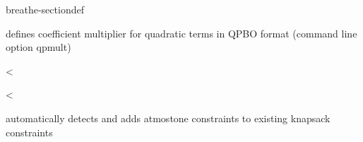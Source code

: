 \documentclass[letterpaper,10pt,openany,oneside,english]{sphinxmanual}
\begin{document}
\begin{fulllineitems}
\begin{sphinxuseclass}{breathe-sectiondef}
\begin{fulllineitems}
\sphinxAtStartPar
defines coefficient multiplier for quadratic terms in QPBO format (command line option \sphinxhyphen{}qpmult) 

\end{fulllineitems}


\begin{fulllineitems}
\label{\detokenize{ref/ref_cpp:_CPPv4N8ToulBar217addAMOConstraintsE}}\label{\detokenize{ref/ref_cpp:_CPPv3N8ToulBar217addAMOConstraintsE}}\label{\detokenize{ref/ref_cpp:_CPPv2N8ToulBar217addAMOConstraintsE}}\label{\detokenize{ref/ref_cpp:ToulBar2::addAMOConstraints__b}}
\pysigstartsignatures
\pysigstartmultiline
{}
\pysigstopmultiline
\pysigstopsignatures
\sphinxAtStartPar
\textless{} 

\end{fulllineitems}


\begin{fulllineitems}
\label{\detokenize{ref/ref_cpp:_CPPv4N8ToulBar218addAMOConstraints_E}}\label{\detokenize{ref/ref_cpp:_CPPv3N8ToulBar218addAMOConstraints_E}}\label{\detokenize{ref/ref_cpp:_CPPv2N8ToulBar218addAMOConstraints_E}}\label{\detokenize{ref/ref_cpp:ToulBar2::addAMOConstraints___b}}
\pysigstartsignatures
\pysigstartmultiline
{}
\pysigstopmultiline
\pysigstopsignatures
\sphinxAtStartPar
\textless{} 

\sphinxAtStartPar
automatically detects and adds at\sphinxhyphen{}most\sphinxhyphen{}one constraints to existing knapsack constraints 

\end{fulllineitems}



\end{sphinxuseclass}
\end{fulllineitems}
\end{document}
